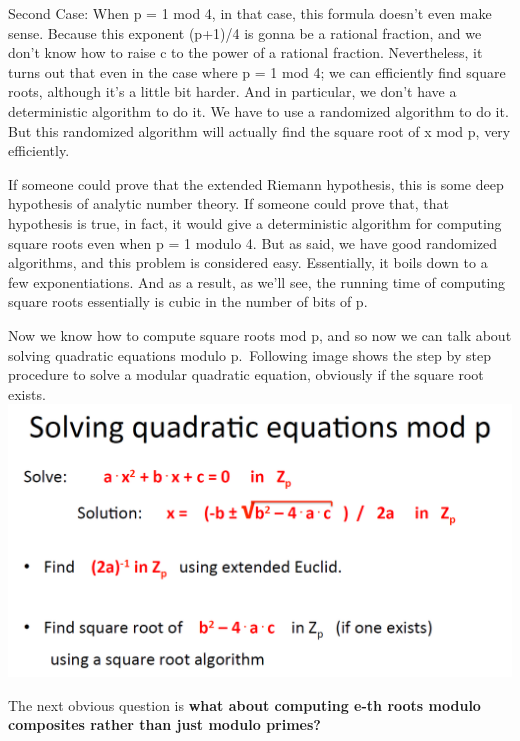 \documentclass[11pt]{article}
\makeatletter
\def\maxwidth{\ifdim\Gin@nat@width>\linewidth\linewidth
    \else\Gin@nat@width\fi}
\let\Oldincludegraphics\includegraphics
\renewcommand{\includegraphics}[1]{\Oldincludegraphics[width=.8\maxwidth]{#1}}
\makeatother
\begin{document}
Second Case: When p = 1 mod 4, in that case, this formula doesn't even
make sense. Because this exponent (p+1)/4 is gonna be a rational
fraction, and we don't know how to raise c to the power of a rational
fraction. Nevertheless, it turns out that even in the case where p = 1
mod 4; we can efficiently find square roots, although it's a little bit
harder. And in particular, we don't have a deterministic algorithm to do
it. We have to use a randomized algorithm to do it. But this randomized
algorithm will actually find the square root of x mod p, very
efficiently.

If someone could prove that the extended Riemann hypothesis, this is
some deep hypothesis of analytic number theory. If someone could prove
that, that hypothesis is true, in fact, it would give a deterministic
algorithm for computing square roots even when p = 1 modulo 4. But as
said, we have good randomized algorithms, and this problem is considered
easy. Essentially, it boils down to a few exponentiations. And as a
result, as we'll see, the running time of computing square roots
essentially is cubic in the number of bits of p.

Now we know how to compute square roots mod p, and so now we can talk
about solving quadratic equations modulo p.~Following image shows the
step by step procedure to solve a modular quadratic equation, obviously
if the square root exists.
\includegraphics{./Images/NT-SolvinQuadractic.png}

The next obvious question is \textbf{what about computing e-th roots
modulo composites rather than just modulo primes?}
\end{document}
